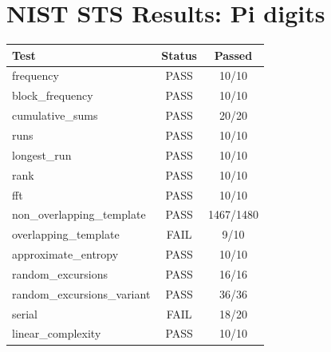 \documentclass{article}
\begin{document}
\section*{NIST STS Results: Pi digits}
\begin{tabular}{lcc}
\toprule
Test & Status & Passed \\
\midrule
frequency & PASS & 10/10 \\
block_frequency & PASS & 10/10 \\
cumulative_sums & PASS & 20/20 \\
runs & PASS & 10/10 \\
longest_run & PASS & 10/10 \\
rank & PASS & 10/10 \\
fft & PASS & 10/10 \\
non_overlapping_template & PASS & 1467/1480 \\
overlapping_template & FAIL & 9/10 \\
approximate_entropy & PASS & 10/10 \\
random_excursions & PASS & 16/16 \\
random_excursions_variant & PASS & 36/36 \\
serial & FAIL & 18/20 \\
linear_complexity & PASS & 10/10 \\
\bottomrule
\end{tabular}
\end{document}
